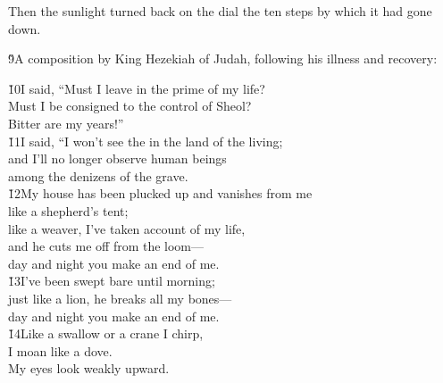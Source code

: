 Then the sunlight turned back on the dial the ten steps by which it had gone down.

\v{9}A composition by King Hezekiah of Judah, following his illness and recovery:

\begin{poetry}
\poeml \v{10}I said, ``Must I leave in the prime of my life? \\
\poemll    Must I be consigned to the control of Sheol? \\
\poemlll       Bitter are my years!'' \\
\poeml \v{11}I said, ``I won't see the  in the land of the living; \\
\poemll    and I'll no longer observe human beings \\
\poemlll       among the denizens of the grave. \\
\poeml \v{12}My house has been plucked up and vanishes from me \\
\poemll    like a shepherd's tent; \\
\poeml like a weaver, I've taken account of my life, \\
\poemll    and he cuts me off from the loom--- \\
\poemlll       day and night you make an end of me. \\
\poeml \v{13}I've been swept bare until morning; \\
\poemll    just like a lion, he breaks all my bones--- \\
\poemlll       day and night you make an end of me. \\
\poeml \v{14}Like a swallow or a crane I chirp, \\
\poemll    I moan like a dove. \\
\poeml My eyes look weakly upward. \\

\end{poetry}
